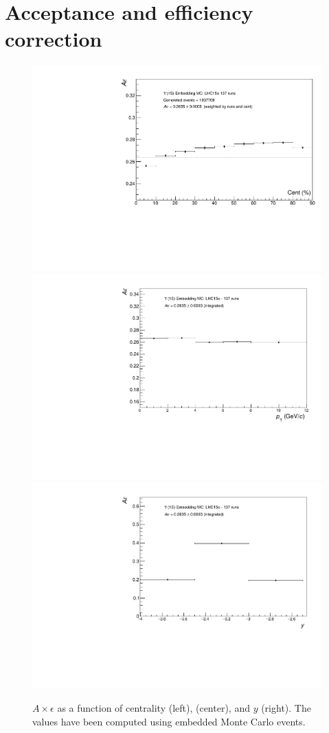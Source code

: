 \section{Acceptance and efficiency correction}

\begin{figure}[htp]

\centering
\includegraphics[width=.5\textwidth]{Chapters/Analysis/Figs/Axe/AccEffvsCent.pdf}\hfill
\includegraphics[width=.5\textwidth]{Chapters/Analysis/Figs/Axe/AccEffvsPt.pdf}\hfill
\includegraphics[width=.5\textwidth]{Chapters/Analysis/Figs/Axe/AccEffvsY.pdf}

\caption{$A\times\epsilon$ as a function of centrality (left), \pt (center), and $y$ (right). The values have been computed using embedded Monte Carlo events.}
\label{fig:Axe}

\end{figure}

